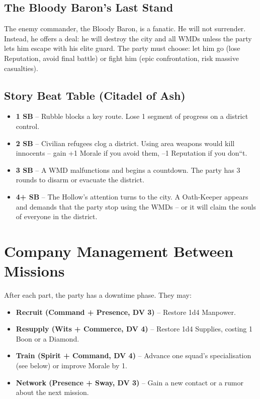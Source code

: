 \documentclass[11pt]{article}
\begin{document}
\subsection*{The Bloody Baron's Last Stand}
The enemy commander, the Bloody Baron, is a fanatic. He will not surrender. Instead, he offers a deal: he will destroy the city and all WMDs unless the party lets him escape with his elite guard. The party must choose: let him go (lose Reputation, avoid final battle) or fight him (epic confrontation, risk massive casualties).

\subsection*{Story Beat Table (Citadel of Ash)}
\begin{itemize}
\item \textbf{1 SB} -- Rubble blocks a key route. Lose 1 segment of progress on a district control.
\item \textbf{2 SB} -- Civilian refugees clog a district. Using area weapons would kill innocents -- gain +1 Morale if you avoid them, --1 Reputation if you don``t.
\item \textbf{3 SB} -- A WMD malfunctions and begins a countdown. The party has 3 rounds to disarm or evacuate the district.
\item \textbf{4+ SB} -- The Hollow's attention turns to the city. A Oath-Keeper appears and demands that the party stop using the WMDs -- or it will claim the souls of everyone in the district.
\end{itemize}

\section*{Company Management Between Missions}

After each part, the party has a downtime phase. They may:

\begin{itemize}
\item \textbf{Recruit (Command + Presence, DV 3)} -- Restore 1d4 Manpower.
\item \textbf{Resupply (Wits + Commerce, DV 4)} -- Restore 1d4 Supplies, costing 1 Boon or a Diamond.
\item \textbf{Train (Spirit + Command, DV 4)} -- Advance one squad's specialisation (see below) or improve Morale by 1.
\item \textbf{Network (Presence + Sway, DV 3)} -- Gain a new contact or a rumor about the next mission.
\end{itemize}
\end{document}
